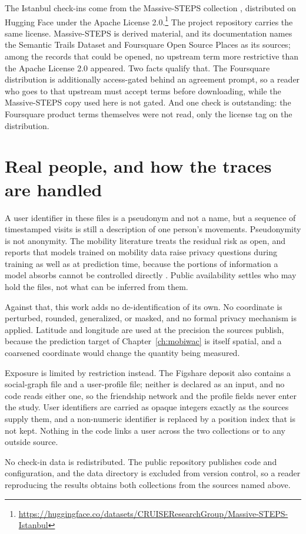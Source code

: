 The Istanbul check-ins come from the Massive-STEPS collection
\cite{wongso2025massivesteps}, distributed on Hugging Face under the Apache License
2.0.\footnote{\url{https://huggingface.co/datasets/CRUISEResearchGroup/Massive-STEPS-Istanbul}}
The project repository carries the same license. Massive-STEPS is derived material, and
its documentation names the Semantic Trails Dataset and Foursquare Open Source Places as
its sources; among the records that could be opened, no upstream term more restrictive
than the Apache License 2.0 appeared. Two facts qualify that. The Foursquare
distribution is additionally access-gated behind an agreement prompt, so a reader who goes
to that upstream must accept terms before downloading, while the Massive-STEPS copy used
here is not gated. And one check is outstanding: the Foursquare product terms themselves
were not read, only the license tag on the distribution.

\section{Real people, and how the traces are handled}

A user identifier in these files is a pseudonym and not a name, but a sequence of
timestamped visits is still a description of one person's movements. Pseudonymity is not
anonymity. The mobility literature treats the residual risk as open, and reports that
models trained on mobility data raise privacy questions during training as well as at
prediction time, because the portions of information a model absorbs cannot be
controlled directly \cite{luca2021mobilitysurvey}. Public availability settles who may
hold the files, not what can be inferred from them.

Against that, this work adds no de-identification of its own. No coordinate is
perturbed, rounded, generalized, or masked, and no formal privacy mechanism is
applied. Latitude and
longitude are used at the precision the sources publish, because the prediction target
of Chapter~\ref{ch:mobiwac} is itself spatial, and a coarsened coordinate would change
the quantity being measured.

Exposure is limited by restriction instead. The Figshare deposit also contains a
social-graph file and a user-profile file; neither is declared as an input, and no code
reads either one, so the friendship network and the profile fields never enter the
study. User identifiers are carried as opaque integers exactly as the sources supply
them, and a non-numeric identifier is replaced by a position index that is not kept.
Nothing in the code links a user across the two collections or to any outside source.

No check-in data is redistributed. The public repository publishes code and
configuration, and the data directory is excluded from version control, so a reader
reproducing the results obtains both collections from the sources named above.
